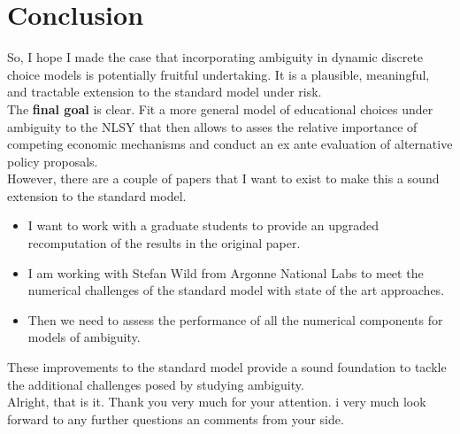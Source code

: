 \section{Conclusion}
So, I hope I made the case that incorporating ambiguity in dynamic discrete choice models is potentially fruitful undertaking. It is a plausible, meaningful, and tractable extension to the standard model under risk.\\\newline
%
The \textbf{final goal} is clear. Fit a more general model of educational choices under ambiguity to the NLSY that then allows to asses the relative importance of competing economic mechanisms and conduct an ex ante evaluation of alternative policy proposals.\\\newline
% 
However, there are a couple of papers that I want to exist to make this a sound extension to the standard model. 

\begin{itemize}
\item I want to work with a graduate students to provide an upgraded recomputation of the results in the original paper.
\item I am working with Stefan Wild from Argonne National Labs to meet the numerical challenges of the standard model with state of the art approaches. 
\item Then we need to assess the performance of all the numerical components for models of ambiguity.
\end{itemize}

These improvements to the standard model provide a sound foundation to tackle the additional challenges posed by studying ambiguity.\\\newline
%
Alright, that is it. Thank you very much for your attention. i very much look forward to any further questions an comments from your side.






\nocite{Iyengar.2005,Maccheroni.2006,Gilboa.1989,Hansen.2007,Eisenhauer.2015b}

\newpage


